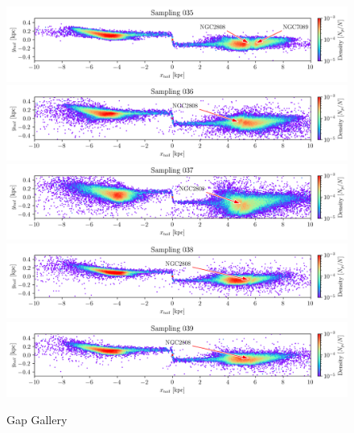 \documentclass[draft]{aa}
\begin{document}
\begin{appendix}
    \begin{figure}
      \centering
      \includegraphics[width=\linewidth]{gallery_of_gaps_monte-carlo-035.png}
      \includegraphics[width=\linewidth]{gallery_of_gaps_monte-carlo-036.png}
      \includegraphics[width=\linewidth]{gallery_of_gaps_monte-carlo-037.png}
      \includegraphics[width=\linewidth]{gallery_of_gaps_monte-carlo-038.png}
      \includegraphics[width=\linewidth]{gallery_of_gaps_monte-carlo-039.png}
      \caption{Gap Gallery}
      \label{fig:TailCoordinates}
    \end{figure}    




\end{appendix}
\end{document}
